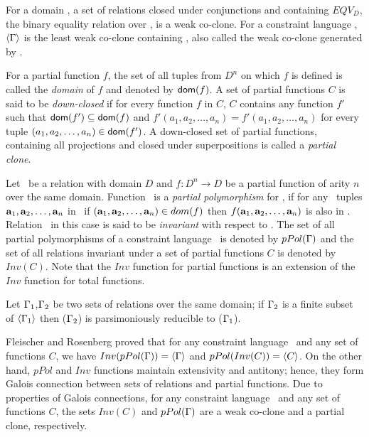 For a domain \mD, a set of relations closed under conjunctions and
containing \(EQV_D\), the binary equality relation over \mD,
is a weak co-clone. For a constraint language \mrelset, 
\(\langle \Gamma \rangle\) is the least weak co-clone containing \mrelset,
also called the weak co-clone generated by \mrelset\@.

For a partial function \(f\), the set of all tuples from \(D^n\) on which \(f\) is
defined is called the \emph{domain} of \(f\) and denoted by \({\sf dom}(f)\).
A set of partial functions \(C\) is said to be \emph{down-closed} if
for every function \(f\) in \(C\), \(C\) contains any function \(f'\) such that \({\sf dom}(f')\subseteq{\sf dom}(f)\) and \(f'(a_1,a_2,\dotsc,a_n)=f'(a_1,a_2,\dotsc,a_n)\)
for every tuple \((a_1,a_2,\dotsc,a_n)\in {\sf dom}(f')\)\@.
A down-closed set of partial functions, 
containing all projections and closed under 
superpositions is called a \emph{partial clone}. 

Let \mR\ be a relation with domain \(D\) and \(f:D^n\to D\) be a partial function of arity \(n\)
over the same domain.
Function \mf\ is a \emph{partial polymorphism} for \mR,
if for any \mn\ tuples \(\textbf{a}_1,\textbf{a}_2,\dotsc,\textbf{a}_n\) in \mR\, 
if  \((\textbf{a}_1,\textbf{a}_2,\dotsc,\textbf{a}_n) \in dom(f)\) then 
\(f(\textbf{a}_1,\textbf{a}_2,\dotsc,\textbf{a}_n)\) is also in \mR\@. Relation \mR\ in this case is said to
be \emph{invariant} with respect to \mf\@.
The set of all partial polymorphisms of a constraint language \mrelset\ is denoted by
\(pPol(\Gamma)\) and the set of all relations invariant under a set of partial functions
\(C\) is denoted by \(Inv(C)\)\@. Note that the \(Inv\) function for partial functions is
an extension of the \(Inv\) function for total functions.

\begin{theorem}  \label{trm:partial}
Let \(\Gamma_1\),\(\Gamma_2\) be two sets of relations over the same domain; if 
\(\Gamma_2\) is a finite subset of \(\langle \Gamma_1 \rangle\) then
\ccsp(\(\Gamma_2\)) is parsimoniously reducible to \ccsp(\(\Gamma_1\))\@.
\end{theorem}

Fleischer and Rosenberg \cite{Rosenberg} proved that for any constraint language \mrelset\
and any set of functions \(C\),
we have \(Inv(pPol(\Gamma))=\langle \Gamma \rangle\) and
\(pPol(Inv(C))=\langle C \rangle\)\@. On the other hand, \(pPol\) and \(Inv\) functions 
maintain extensivity and antitony; hence, they form Galois connection between 
sets of relations and partial functions. Due to properties of Galois connections,
for any constraint language \mrelset\ and any set of functions \(C\), the 
sets \(Inv(C)\) and \(pPol(\Gamma)\) are a weak co-clone and a partial clone, respectively.

